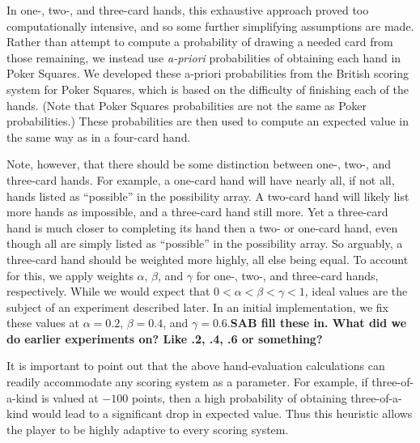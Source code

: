 \documentclass[letterpaper]{article}
\begin{document}
In one-, two-, and three-card hands, this exhaustive approach proved too computationally intensive, and so some further simplifying assumptions are made. Rather than attempt to compute a probability of drawing a needed card from those remaining, we instead use {\it a-priori} probabilities of obtaining each hand in Poker Squares. We developed these a-priori probabilities from the British scoring system for Poker Squares, which is based on the difficulty of finishing each of the hands. (Note that Poker Squares probabilities are not the same as Poker probabilities.) These probabilities are then used to compute an expected value in the same way as in a four-card hand.

Note, however, that there should be some distinction between one-, two-, and three-card hands. For example, a one-card hand will have nearly all, if not all, hands listed as ``possible'' in the possibility array. A two-card hand will likely list more hands as impossible, and a three-card hand still more. Yet a three-card hand is much closer to completing its hand then a two- or one-card hand, even though all are simply listed as ``possible'' in the possibility array. So arguably, a three-card hand should be weighted more highly, all else being equal. To account for this, we apply weights $\alpha$, $\beta$, and $\gamma$ for one-, two-, and three-card hands, respectively. While we would expect that $0 < \alpha < \beta < \gamma < 1$, ideal values are the subject of an experiment described later. In an initial implementation, we fix these values at $\alpha = 0.2$, $\beta = 0.4$, and $\gamma = 0.6$.{\bf SAB fill these in. What did we do earlier experiments on? Like .2, .4, .6 or something?}


It is important to point out that the above hand-evaluation calculations can readily accommodate any scoring system as a parameter. For example, if three-of-a-kind is valued at $-100$ points, then a high probability of obtaining three-of-a-kind would lead to a significant drop in expected value. Thus this heuristic allows the player to be highly adaptive to every scoring system.
\end{document}
